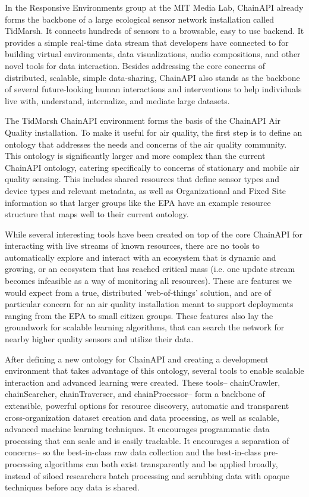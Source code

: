 In the Responsive Environments group at the MIT Media Lab, ChainAPI already forms the backbone of a large ecological sensor network installation called TidMarsh.  It connects hundreds of sensors to a browsable, easy to use backend.  It provides a simple real-time data stream that developers have connected to for building virtual environments, data visualizations, audio compositions, and other novel tools for data interaction.  Besides addressing the core concerns of distributed, scalable, simple data-sharing, ChainAPI also stands as the backbone of several future-looking human interactions and interventions to help individuals live with, understand, internalize, and mediate large datasets.

The TidMarsh ChainAPI environment forms the basis of the ChainAPI Air Quality installation.  To make it useful for air quality, the first step is to define an ontology that addresses the needs and concerns of the air quality community.  This ontology is significantly larger and more complex than the current ChainAPI ontology, catering specifically to concerns of stationary and mobile air quality sensing.  This includes shared resources that define sensor types and device types and relevant metadata, as well as Organizational and Fixed Site information so that larger groups like the EPA have an example resource structure that maps well to their current ontology.

While several interesting tools have been created on top of the core ChainAPI for interacting with live streams of known resources, there are no tools to automatically explore and interact with an ecosystem that is dynamic and growing, or an ecosystem that has reached critical mass (i.e. one update stream becomes infeasible as a way of monitoring all resources).  These are features we would expect from a true, distributed 'web-of-things' solution, and are of particular concern for an air quality installation meant to support deployments ranging from the EPA to small citizen groups.  These features also lay the groundwork for scalable learning algorithms, that can search the network for nearby higher quality sensors and utilize their data.

After defining a new ontology for ChainAPI and creating a development environment that takes advantage of this ontology, several tools to enable scalable interaction and advanced learning were created.  These tools-- chainCrawler, chainSearcher, chainTraverser, and chainProcessor-- form a backbone of extensible, powerful options for resource discovery, automatic and transparent cross-organization dataset creation and data processing, as well as scalable, advanced machine learning techniques.  It encourages programmatic data processing that can scale and is easily trackable.  It encourages a separation of concerns-- so the best-in-class raw data collection and the best-in-class pre-processing algorithms can both exist transparently and be applied broadly, instead of siloed researchers batch processing and scrubbing data with opaque techniques before any data is shared.

